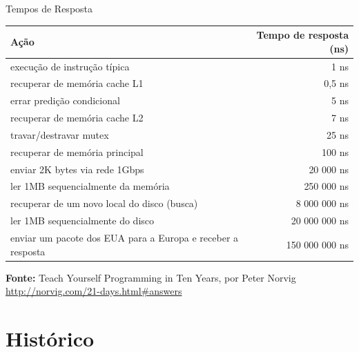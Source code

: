 \documentclass[12pt]{beamer}
\begin{document}
\begin{frame}[fragile]{Tempos de Resposta}
  \scriptsize{
  \begin{table}
    \vspace{-0.5cm}
    \begin{tabular}{@{} lr @{}}
      \toprule
      Ação & Tempo de resposta (ns)\\
      \midrule
      execução de instrução típica & 1 ns\\
      recuperar de memória cache L1 & 0,5 ns\\
      errar predição condicional & 5 ns\\
      recuperar de memória cache L2 & 7 ns\\
      travar/destravar mutex & 25 ns\\
      recuperar de memória principal & 100 ns\\
      enviar 2K bytes via rede 1Gbps & 20 000 ns\\
      ler 1MB sequencialmente da memória & 250 000 ns\\
      recuperar de um novo local do disco (busca) & 8 000 000 ns\\
      ler 1MB sequencialmente do disco & 20 000 000 ns\\
      enviar um pacote dos EUA para a Europa e receber a resposta & 150 000 000 ns\\
      \bottomrule
    \end{tabular}
  \end{table}}
  \begin{flushright}
    \footnotesize{\vspace{-0.75cm}
                  \textbf{Fonte:} Teach Yourself Programming in Ten Years, por Peter Norvig\\
                  \url{http://norvig.com/21-days.html#answers}}
  \end{flushright}
\end{frame}



\section{Histórico}
\end{document}
